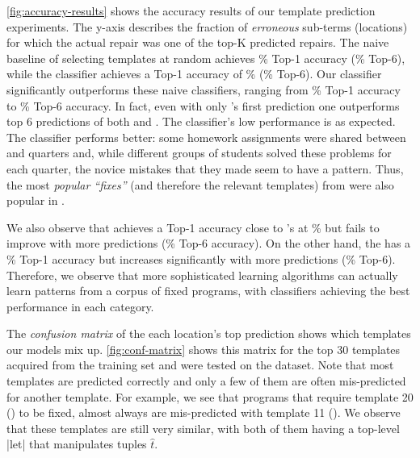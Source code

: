

%
\autoref{fig:accuracy-results} shows the accuracy results of our template
prediction experiments. The y-axis describes the fraction of \emph{erroneous}
sub-terms (locations) for which the actual repair was one of the top-K predicted
repairs.
%
The naive baseline of selecting templates at random achieves \RandomTopOne\%
Top-1 accuracy (\RandomTopSix\% Top-6), while the \popular classifier achieves a
Top-1 accuracy of \PopularTopOne\% (\PopularTopSix\% Top-6).
%
Our \dnn classifier significantly outperforms these naive classifiers, ranging
from \DnnTopOne\% Top-1 accuracy to \DnnTopSix\% Top-6 accuracy.
%
In fact, even with only \dnn's first prediction one outperforms top 6
predictions of both \random and \popular.
%
The \random classifier's low performance is as expected.
%
The \popular classifier performs better: some homework assignments were shared
between \SPRING and \FALL quarters and, while different groups of students
solved these problems for each quarter, the novice mistakes that they made seem
to have a pattern. Thus, the most \emph{popular ``fixes''} (and therefore the
relevant templates) from \SPRING were also popular in \FALL.

We also observe that \trees achieves a Top-1 accuracy close to \dnn's at
\TreeTopOne\% but fails to improve with more predictions (\TreeTopSix\% Top-6
accuracy). On the other hand, the \svm has a \SVMTopOne\% Top-1 accuracy but
increases significantly with more predictions (\SVMTopSix\% Top-6).
%
Therefore, we observe that more sophisticated learning algorithms can actually
learn patterns from a corpus of fixed programs, with \dnn classifiers achieving
the best performance in each category.

%
The \emph{confusion matrix} of the each location's top prediction shows which
templates our models mix up.
%
\autoref{fig:conf-matrix} shows this matrix for the top 30 templates acquired
from the \SPRING training set and were tested on the \FALL dataset.
%
Note that most templates are predicted correctly and only a few of them are
often mis-predicted for another template.
%
For example, we see that programs that require template 20
() to be fixed,
almost always are mis-predicted with template 11 (). We observe that these templates are still very
similar, with both of them having a top-level |let| that manipulates tuples
$\hat{t}$.

